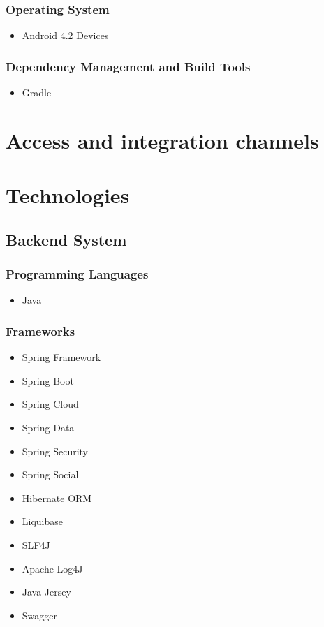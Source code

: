 \documentclass[a4paper,10pt]{article}
\begin{document}
\subsubsection{Operating System}
	\begin{itemize}
		\item Android 4.2 Devices
	\end{itemize}

\subsubsection{Dependency Management and Build Tools}
	\begin{itemize}
		\item Gradle
	\end{itemize}








\section{Access and integration channels}

\section{Technologies}
\subsection{Backend System}
\subsubsection{Programming Languages}
	\begin{itemize}
		\item Java
\end{itemize}
\subsubsection{Frameworks}
	\begin{itemize}
		\item Spring Framework
		\item Spring Boot
		\item Spring Cloud
		\item Spring Data
		\item Spring Security
		\item Spring Social
		\item Hibernate ORM
		\item Liquibase
		\item SLF4J
		\item Apache Log4J
		\item Java Jersey		
		\item Swagger
	\end{itemize}
\end{document}
